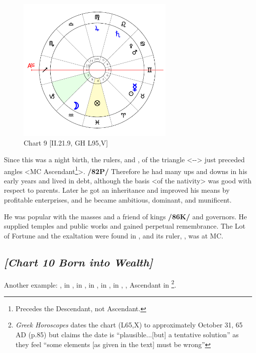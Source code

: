 \clearpage
\begin{figure}
\centering
\vspace{-20pt}
\includegraphics[width=0.68\textwidth]{charts/2_21_9}
\caption{Chart 9 [II.21.9, GH L95,V]}
\label{fig:chart09}
\end{figure}

Since this was a night birth, the rulers, \Saturn\xspace and \Mercury, of the triangle <\Gemini-\Libra-\Aquarius> just preceded angles <MC Ascendant\footnote{Precedes the Descendant, not Ascendant.}>. \textbf{/82P/} Therefore he had many ups and downs in his early years and lived in debt, although the basis <of the nativity> was good
with respect to parents. Later he got an inheritance and improved his means by profitable enterprises, and he became ambitious, dominant, and munificent. 

He was popular with the masses and a friend of kings \textbf{/86K/} and governors. He supplied temples and public works and gained perpetual remembrance. The Lot of Fortune and the exaltation were found in \Pisces, and its ruler, \Jupiter, was at MC.
\newpage
\subsection*{\textit{[Chart 10 Born into Wealth]}}

Another example: \Sun, \Mercury\xspace in \Scorpio, \Moon\xspace in \Aries, \Saturn\xspace in \Virgo, \Jupiter\xspace in \Pisces, \Mars\xspace in \Leo, \Venus, Ascendant in \Sagittarius
\footnote{\textit{Greek Horoscopes} dates the chart (L65,X) to approximately October 31, 65 AD (p.85) but claims the date is ``plausible...[but] a tentative solution'' as they feel ``some elements [as given in the text] must be wrong''}.

